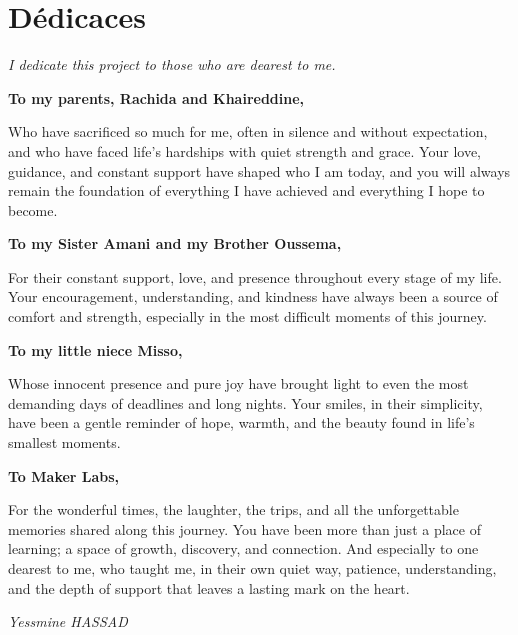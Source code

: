 \chapter*{Dédicaces}

\begin{center}
\textit{I dedicate this project to those who are dearest to me.}
\end{center}

\bigskip

\begin{center}\textbf{To my parents, Rachida and Khaireddine,}\end{center}
Who have sacrificed so much for me, often in silence and without expectation,
and who have faced life's hardships with quiet strength and grace. Your love,
guidance, and constant support have shaped who I am today, and you will always
remain the foundation of everything I have achieved and everything I hope to become.

\bigskip

\begin{center}\textbf{To my Sister Amani and my Brother Oussema,}\end{center}
For their constant support, love, and presence throughout every stage of my life.
Your encouragement, understanding, and kindness have always been a source of comfort
and strength, especially in the most difficult moments of this journey.

\bigskip

\begin{center}\textbf{To my little niece Misso,}\end{center}
Whose innocent presence and pure joy have brought light to even the most demanding
days of deadlines and long nights. Your smiles, in their simplicity, have been a
gentle reminder of hope, warmth, and the beauty found in life's smallest moments.

\bigskip

\begin{center}\textbf{To Maker Labs,}\end{center}
For the wonderful times, the laughter, the trips, and all the unforgettable memories
shared along this journey. You have been more than just a place of learning; a space
of growth, discovery, and connection. And especially to one dearest to me, who taught
me, in their own quiet way, patience, understanding, and the depth of support that
leaves a lasting mark on the heart.

\vfill
\begin{flushright}
\textit{Yessmine HASSAD}
\end{flushright}